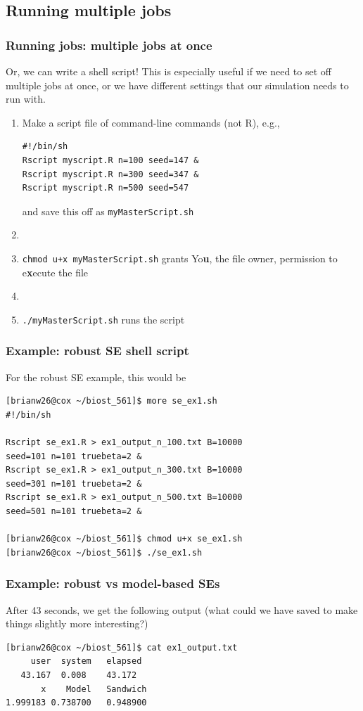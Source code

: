 \documentclass[12pt, 
hyperref={colorlinks=true, linkcolor=blue, urlcolor=cyan}]{beamer}
\begin{document}
\subsection{Running multiple jobs}
\begin{frame}[fragile]
\frametitle{Running jobs: multiple jobs at once}
Or, we can write a shell script! This is especially useful if we need to set off multiple jobs at once, or we have different settings that our simulation needs to run with. 
\begin{enumerate}
\item Make a script file of command-line commands (not R), e.g., 
\begin{verbatim}
#!/bin/sh
Rscript myscript.R n=100 seed=147 &
Rscript myscript.R n=300 seed=347 &
Rscript myscript.R n=500 seed=547
\end{verbatim}
and save this off as \texttt{myMasterScript.sh}
\item[]
\item \texttt{chmod u+x myMasterScript.sh} grants Yo\textbf{u}, the file owner, permission to e\textbf{x}ecute the file
\item[]
\item \texttt{./myMasterScript.sh} runs the script
\end{enumerate}
\end{frame}

\begin{frame}[fragile]
\frametitle{Example: robust SE shell script}
For the robust SE example, this would be 
{\scriptsize
\begin{verbatim}
[brianw26@cox ~/biost_561]$ more se_ex1.sh
#!/bin/sh

Rscript se_ex1.R > ex1_output_n_100.txt B=10000 
seed=101 n=101 truebeta=2 &
Rscript se_ex1.R > ex1_output_n_300.txt B=10000 
seed=301 n=101 truebeta=2 &
Rscript se_ex1.R > ex1_output_n_500.txt B=10000 
seed=501 n=101 truebeta=2 &

[brianw26@cox ~/biost_561]$ chmod u+x se_ex1.sh
[brianw26@cox ~/biost_561]$ ./se_ex1.sh
\end{verbatim}
}
\end{frame}

\begin{frame}[fragile]
\frametitle{Example: robust vs model-based SEs}
After 43 seconds, we get the following output (what could we have saved to make things slightly more interesting?)

\begin{verbatim}
[brianw26@cox ~/biost_561]$ cat ex1_output.txt
     user  system   elapsed
   43.167  0.008    43.172
       x    Model   Sandwich
1.999183 0.738700   0.948900
\end{verbatim}
\end{frame}
\end{document}
